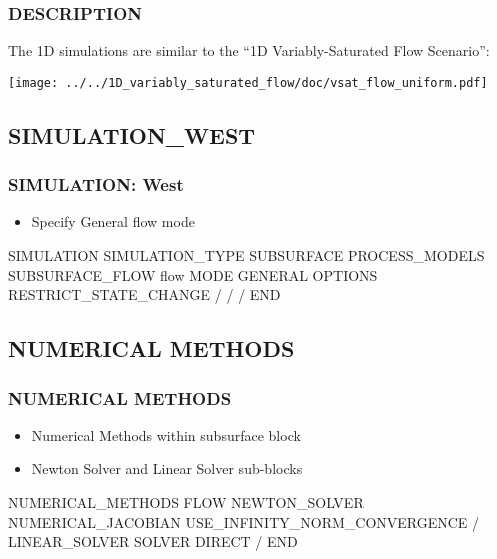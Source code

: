 \documentclass{beamer}
\begin{document}
\begin{frame}[fragile]\frametitle{DESCRIPTION}

The 1D simulations are similar to the ``1D Variably-Saturated Flow Scenario'':

\texttt{[image: ../../1D\_variably\_saturated\_flow/doc/vsat\_flow\_uniform.pdf]}

\end{frame}

\subsection{SIMULATION\_WEST}

\begin{frame}[fragile]\frametitle{SIMULATION: West}

\begin{itemize}
\item Specify General flow mode
\end{itemize}


\begin{semiverbatim}

SIMULATION
  SIMULATION_TYPE SUBSURFACE
  PROCESS_MODELS
    SUBSURFACE_FLOW flow
      MODE GENERAL
      OPTIONS
        RESTRICT_STATE_CHANGE
      /
    /
  /
END
\end{semiverbatim}

\end{frame}

\subsection{NUMERICAL METHODS}
\begin{frame}[fragile]\frametitle{NUMERICAL METHODS}

\begin{itemize}
  \item Numerical Methods within subsurface block
  \item Newton Solver and Linear Solver sub-blocks
\end{itemize}

\begin{semiverbatim}
NUMERICAL_METHODS FLOW
  NEWTON_SOLVER
    NUMERICAL_JACOBIAN
    USE_INFINITY_NORM_CONVERGENCE
  /
  LINEAR_SOLVER
    SOLVER DIRECT
  /
END
\end{semiverbatim}
\end{frame}
\end{document}

